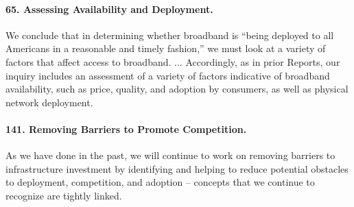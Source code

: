 
\paragraph{65. Assessing Availability and Deployment.} We conclude that in determining
whether broadband is ``being deployed to all Americans in a reasonable and timely fashion,''
we must look at a variety of factors that affect access to broadband. ... Accordingly, as
in prior Reports, our inquiry includes an assessment of a variety of factors indicative of
broadband availability, such as price, quality, and adoption by consumers, as well as
physical network deployment.

\paragraph{141. Removing Barriers to Promote Competition. }
As we have done in the past, we will continue to work on removing barriers to infrastructure
investment by identifying and helping to reduce potential obstacles to deployment, 
competition, and adoption -- concepts that we continue to recognize are tightly linked.

